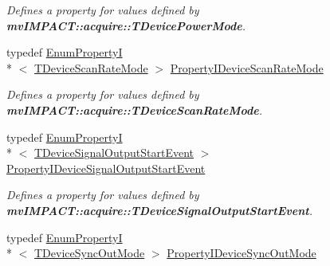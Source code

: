 \begin{DoxyCompactItemize}
\begin{DoxyCompactList}\small\item\em Defines a property for values defined by {\bfseries mv\+I\+M\+P\+A\+C\+T\+::acquire\+::\+T\+Device\+Power\+Mode}. \end{DoxyCompactList}\item 
\hypertarget{group___device_specific_interface_gaec7b599c0645e2ee61b6be26320ae04e}{typedef \hyperlink{classmv_i_m_p_a_c_t_1_1acquire_1_1_enum_property_i}{Enum\+Property\+I}\\*
$<$ \hyperlink{group___device_specific_interface_ga7bca9cd5c970d423f2c1a2a065f3018c}{T\+Device\+Scan\+Rate\+Mode} $>$ \hyperlink{group___device_specific_interface_gaec7b599c0645e2ee61b6be26320ae04e}{Property\+I\+Device\+Scan\+Rate\+Mode}}\label{group___device_specific_interface_gaec7b599c0645e2ee61b6be26320ae04e}

\begin{DoxyCompactList}\small\item\em Defines a property for values defined by {\bfseries mv\+I\+M\+P\+A\+C\+T\+::acquire\+::\+T\+Device\+Scan\+Rate\+Mode}. \end{DoxyCompactList}\item 
\hypertarget{group___device_specific_interface_ga63bede647f87c0203f196d9002ffac9e}{typedef \hyperlink{classmv_i_m_p_a_c_t_1_1acquire_1_1_enum_property_i}{Enum\+Property\+I}\\*
$<$ \hyperlink{group___device_specific_interface_ga83333b94d7a6a3f1ba96189b4e71fac0}{T\+Device\+Signal\+Output\+Start\+Event} $>$ \hyperlink{group___device_specific_interface_ga63bede647f87c0203f196d9002ffac9e}{Property\+I\+Device\+Signal\+Output\+Start\+Event}}\label{group___device_specific_interface_ga63bede647f87c0203f196d9002ffac9e}

\begin{DoxyCompactList}\small\item\em Defines a property for values defined by {\bfseries mv\+I\+M\+P\+A\+C\+T\+::acquire\+::\+T\+Device\+Signal\+Output\+Start\+Event}. \end{DoxyCompactList}\item 
\hypertarget{group___device_specific_interface_ga482ce750b5e60bc66a44cd2640ae757e}{typedef \hyperlink{classmv_i_m_p_a_c_t_1_1acquire_1_1_enum_property_i}{Enum\+Property\+I}\\*
$<$ \hyperlink{group___device_specific_interface_gad576d8b9fd814fca5847184679d793b7}{T\+Device\+Sync\+Out\+Mode} $>$ \hyperlink{group___device_specific_interface_ga482ce750b5e60bc66a44cd2640ae757e}{Property\+I\+Device\+Sync\+Out\+Mode}}\label{group___device_specific_interface_ga482ce750b5e60bc66a44cd2640ae757e}


\end{DoxyCompactItemize}
